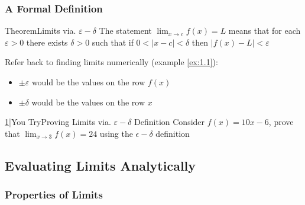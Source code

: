 \documentclass{MathNotes}
\newenvironment{theorem}[1]{\begin{GrayBox}{Theorem}{#1}}{\end{GrayBox}}
\newenvironment{practice}[2]{\begin{PurpleBox}{\texorpdfstring{#1}\Big|You Try}{#2}}{\end{PurpleBox}}
\begin{document}
\newpage
\subsubsection{A Formal Definition}

\begin{multicols}{2}
	\begin{theorem}{Limits via. $\varepsilon - \delta$}
		The statement $\lim_{x\to c}f(x)=L$ means that for each $\varepsilon > 0$ there
		exists $ \delta>0 $ such that if $0<\lvert x-c \rvert < \delta$ then
		$\lvert f(x)-L \rvert < \varepsilon$
	\end{theorem}

	\centering
	
\end{multicols}
Refer back to finding limits numerically (example \ref{ex:1.1}):
\begin{itemize}
	\item $\pm\varepsilon$ would be the values on the row $f(x)$
	\item $\pm\delta$ would be the values on the row $x$
\end{itemize}


\begin{practice}{\hyperref[ans:1.1.2-1]{1}}{Proving Limits via. $\varepsilon-\delta$ Definition}
	\label{prac:1.1.2-1}
	Consider $f(x)=10x-6$, prove that $\displaystyle\lim_{x\to 3}f(x)=24$ using the
	$\epsilon-\delta$ definition
\end{practice}

\subsection{Evaluating Limits Analytically}

\subsubsection{Properties of Limits}
\end{document}
